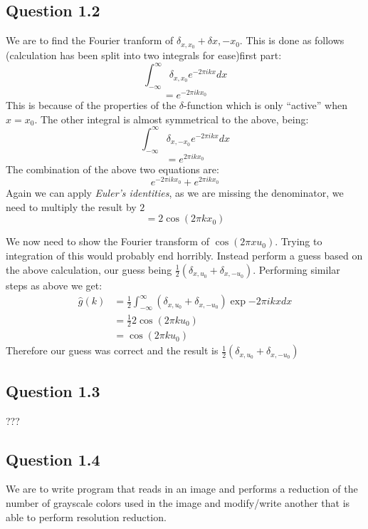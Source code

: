 \documentclass[a4paper, 10pt, final]{article}
\begin{document}
\subsection*{Question 1.2}
We are to find the Fourier tranform of $\delta_{x,x_{0}} + \delta{x,-x_{0}}$. This is done as follows (calculation has been split into two integrals for ease)first part:
\begin{equation*}
   \int_{-\infty}^{\infty} {\delta_{x,x_{0}} e^{-2\pi ikx}dx}
\end{equation*}
\[
  = e^{-2 \pi ikx_{0}}
\]
This is because of the properties of the $\delta$-function which is only ``active'' when $x = x_{0}$. The other integral is almost symmetrical to the above, being:
\begin{equation*}
   \int_{-\infty}^{\infty} {\delta_{x,-x_{0}} e^{-2\pi ikx}dx}
\end{equation*}
\[
  = e^{2 \pi ikx_{0}}
\]
The combination of the above two equations are:
\[
e^{-2\pi ikx_{0}} + e^{2\pi ikx_{0}}
\]
Again we can apply \textit{Euler's identities}, as we are missing the denominator, we need to multiply the result by $2$
\[
= 2 \cos{(2\pi kx_{0})}
\]

We now need to show the Fourier transform of $\cos{(2\pi
  xu_{0})}$. Trying to integration of this would probably end
horribly. Instead perform a guess based on the above calculation, our
guess being $\frac{1}{2}(\delta_{x,u_{0}} +
\delta_{x,-u_{0}})$. Performing similar steps as above we get:
\begin{align*}
  \hat{g}(k) & = \frac{1}{2} \int_{-\infty}^{\infty} {(\delta_{x,u_{0}} +\delta_{x,-u_{0}})\exp{-2\pi ikx}dx}\\
  & = \frac{1}{2} 2 \cos{(2\pi ku_{0})} \\
  & = \cos{(2\pi ku_{0})}
\end{align*}
Therefore our guess was correct and the result is
$\frac{1}{2}(\delta_{x,u_{0}} + \delta_{x,-u_{0}})$

\subsection*{Question 1.3}
???
\subsection*{Question 1.4}
We are to write program that reads in an image and performs a reduction of the number of grayscale colors used in the image and modify/write another that is able to perform resolution reduction.
\end{document}
